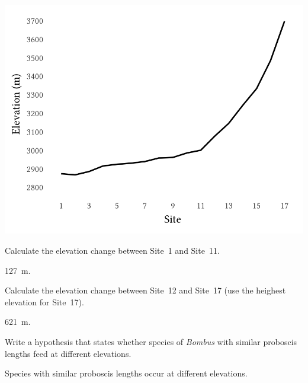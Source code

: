 \documentclass[12pt, hidelinks]{exam}
\newcommand*\AnswerBox[2]{%
    \parbox[t][#1]{0.92\textwidth}{%
    \begin{solution}#2\end{solution}}
    \vspace{\stretch{1}}
}
\begin{document}
\begin{questions}
\begin{multicols}{2}
\columnbreak

\includegraphics[width=\linewidth]{gothic_transect}

\end{multicols}

%
\bigskip

\question
Calculate the elevation change between Site~1 and Site~11.

\AnswerBox{\baselineskip}{127~m.}

\question
Calculate the elevation change between Site~12 and Site~17 (use the 
heighest elevation for Site~17).

\AnswerBox{\baselineskip}{621~m.}

\question
Write a hypothesis that states whether species of \textit{Bombus} 
with similar proboscis lengths feed at different elevations. 

\AnswerBox{0.1\textheight}{Species with similar proboscis lengths occur at different elevations.}


\end{questions}
\end{document}
